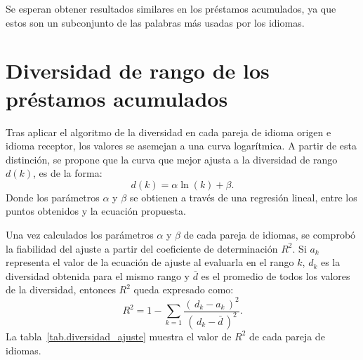 Se esperan obtener resultados similares en los préstamos acumulados, ya que estos son un subconjunto de las palabras más usadas por los idiomas. 

\section{Diversidad de rango de los préstamos acumulados}

Tras aplicar el algoritmo de la diversidad en cada pareja de idioma origen e idioma receptor, los valores se asemejan a una curva logarítmica.  A partir de esta distinción, se propone que la curva que mejor ajusta a la diversidad de rango $d(k)$, es de la forma:
\begin{equation}
\label{ec.ajuste} 
d(k) =  \alpha \ln(k) + \beta. 
\end{equation}
Donde los parámetros $\alpha$ y $\beta$  se  obtienen a través de una regresión lineal, entre los puntos obtenidos y la ecuación propuesta. 

Una vez calculados los parámetros $\alpha$ y $\beta$ de cada pareja de idiomas, se comprobó la fiabilidad del ajuste a partir del coeficiente de determinación $R^{2}$. Si $a_{k}$  representa el valor de la ecuación de ajuste al evaluarla en el rango $k$,  $d_{k}$ es la diversidad obtenida para el mismo rango y $\bar{d}$ es el promedio de todos los valores de la diversidad, entonces $R^{2}$ queda expresado como:
\begin{equation}
R^{2} = 1 - \sum_{k = 1} \frac{ \left( \,d_{k} - a_{k} \,\right)^{2}  }{ \left( \, d_{k} - \bar{d} \,\right)^{2} }.	
\label{ec.r2_diversidad}
\end{equation}
La tabla~\ref{tab.diversidad_ajuste} muestra el valor de $R^{2}$ de cada pareja de idiomas. 

  

